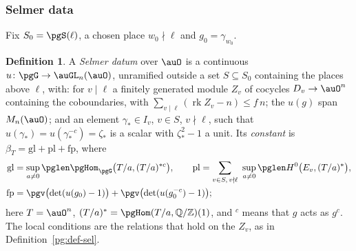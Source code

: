\documentclass[10pt]{amsart}
\theoremstyle{definition}
\newtheorem{definition}[theorem]{Definition}
\theoremstyle{remark}
\newcommand{\Z}{\mathbb Z}
\newcommand{\Q}{\mathbb Q}
\begin{document}
\subsubsection*{Selmer data}
Fix $S_0=\pgS(\ell)$, a chosen place $w_0\nmid\ell$ and $g_0=\gamma_{w_0}$.

\begin{definition}\label{pg:def-datum}
A \emph{Selmer datum} over $\auO$ is a continuous $u\colon\pgG\to\auGL_n(\auO)$, unramified outside
a set $S\subseteq S_0$ containing the places above $\ell$, with: for $v\mid\ell$ a finitely
generated module $Z_v$ of cocycles $D_v\to\auO^n$ containing the coboundaries, with
$\sum_{v\mid\ell}(\operatorname{rk}Z_v-n)\le f\,n$; the $u(g)$ span $M_n(\auO)$; and an element
$\gamma_*\in I_v$, $v\in S$, $v\nmid\ell$, such that $u(\gamma_*)=u(\gamma_*^{-c})=\zeta_*$ is a
scalar with $\zeta_*^2-1$ a unit. Its \emph{constant} is $\beta_T=\mathrm{gl}+\mathrm{pl}+
\mathrm{fp}$, where
\begin{align*}
\mathrm{gl}&=\sup_{a\ne0}\pglen\pgHom_{\pgG}\bigl(T/a,(T/a)^{*c}\bigr),\qquad
\mathrm{pl}=\sum_{v\in S,\,v\nmid\ell}\ \sup_{a\ne0}\pglen H^0\bigl(E_v,(T/a)^*\bigr),\\
\mathrm{fp}&=\pgv\bigl(\det(u(g_0)-1)\bigr)+\pgv\bigl(\det(u(g_0^{-c})-1)\bigr);
\end{align*}
here $T=\auO^n$, $(T/a)^*=\pgHom(T/a,\Q/\Z)(1)$, and $^{c}$ means that $g$ acts as $g^c$. The
local conditions are the relations that hold on the $Z_v$, as in Definition~\ref{pg:def-sel}.
\end{definition}
\end{document}
